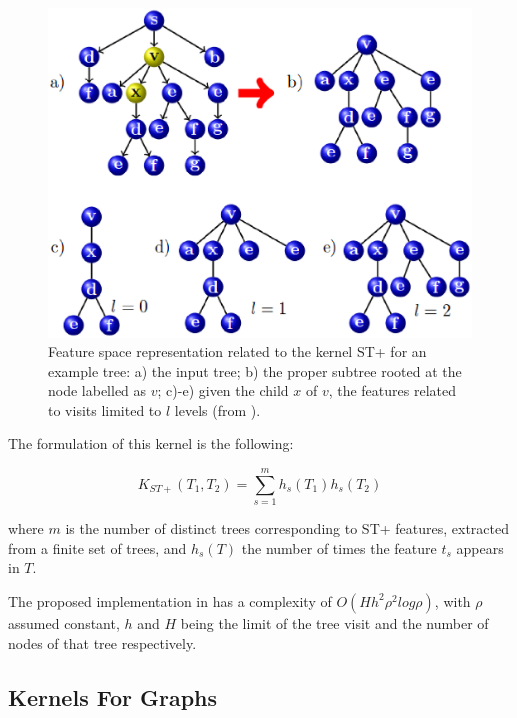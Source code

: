 \begin{figure}[ht]
    \centering
    \includegraphics[scale=0.4]{Figures/featext}
    \caption{Feature space representation related to the kernel ST+ for an example
    tree: a) the input tree; b) the proper subtree rooted at the node labelled as $v$;
    c)-e) given the child $x$ of $v$, the features related to visits limited to $l$ levels (from \cite{dasanmartino2015exploiting}).} 
    \label{fig:featext}
\end{figure}

The formulation of this kernel is the following:

\begin{equation}
    K_{ST+}(T_1, T_2) = \sum_{s=1}^m h_s(T_1)h_s(T_2)
\end{equation}

where $m$ is the number of distinct trees corresponding to ST+ features, extracted
from a finite set of trees, and $h_s(T)$ the number of times the feature $t_s$
appears in $T$.

The proposed implementation in \cite{dasanmartino2015exploiting} has a complexity of
$O(Hh^2\rho^2log\rho)$, with $\rho$ assumed constant, $h$ and $H$ being the limit
of the tree visit and the number of nodes of that tree respectively.

\subsection{Kernels For Graphs}

